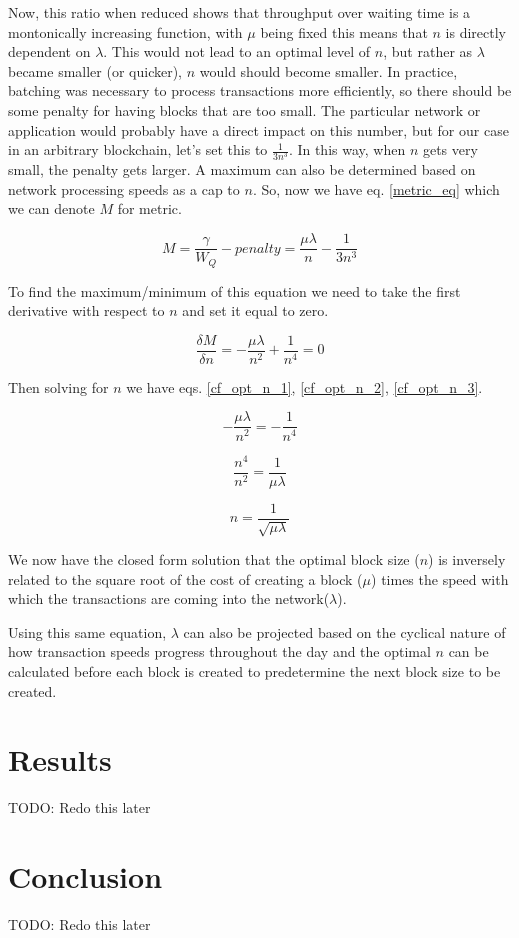 \documentclass[conference]{IEEEtran}
\begin{document}
Now, this ratio when reduced shows that throughput over waiting time is a montonically increasing function, 
with $\mu$ being fixed this means that $n$ is directly dependent on $\lambda$. This would not lead to an optimal 
level of $n$, but rather as $\lambda$ became smaller (or quicker), $n$ would should become smaller. In practice, 
batching was necessary to process transactions more efficiently, so there should be some penalty for having blocks 
that are too small. The particular network or application would probably have a direct impact on this number, but
for our case in an arbitrary blockchain, let's set this to $\frac{1}{3n^3}$. In this way, when $n$ gets very small, 
the penalty gets larger. A maximum can also be determined based on network processing speeds as a cap to 
$n$. So, now we have eq. \ref{metric_eq} which we can denote $M$ for metric.

\begin{equation}
M=\frac{\gamma}{W_Q}-penalty=\frac{\mu\lambda}{n}-\frac{1}{3n^3}\label{metric_eq}
\end{equation}

To find the maximum/minimum of this equation we need to take the first derivative with respect to $n$ 
and set it equal to zero. 

\begin{equation}
\frac{\delta M}{\delta n}=-\frac{\mu\lambda}{n^2}+\frac{1}{n^4}=0\label{metric_deriv}
\end{equation}

Then solving for $n$ we have eqs. \ref{cf_opt_n_1}, \ref{cf_opt_n_2}, \ref{cf_opt_n_3}.

\begin{equation}
-\frac{\mu\lambda}{n^2}=-\frac{1}{n^4}\label{cf_opt_n_1}
\end{equation}

\begin{equation}
\frac{n^4}{n^2}=\frac{1}{\mu\lambda}\label{cf_opt_n_2}
\end{equation}

\begin{equation}
n=\frac{1}{\sqrt{\mu\lambda}}\label{cf_opt_n_3}
\end{equation}

We now have the closed form solution that the optimal block size ($n$) is inversely related to
the square root of the cost of creating a block ($\mu$) times the speed with which the transactions 
are coming into the network($\lambda$). 

Using this same equation, $\lambda$ can also be projected based on the cyclical nature of how transaction
speeds progress throughout the day and the optimal $n$ can be calculated before each block is created to 
predetermine the next block size to be created. 

\section{Results}

TODO: Redo this later

\section{Conclusion}

TODO: Redo this later



\end{document}
